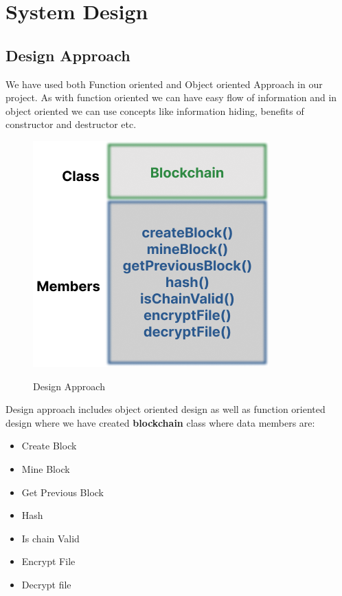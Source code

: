 \newpage
\section{System Design}
\subsection{Design Approach}
We have used both Function oriented and Object oriented Approach in our project. As with function oriented we can have easy flow of information and in object oriented we can use concepts like information hiding, benefits of constructor and destructor etc.
\begin{figure}[H]
    \centering
    \includegraphics[scale=0.55]{images/oops.png}\\[0.5cm]
    \caption{Design Approach}
    \label{fig:my_label}
\end{figure}

Design approach includes object oriented design as well as function oriented design where we have created \textbf{blockchain} class where data members are: 
\begin{itemize}
    \item Create Block
    \item Mine Block
    \item Get Previous Block
    \item Hash
    \item Is chain Valid
    \item Encrypt File
    \item Decrypt file
\end{itemize}

